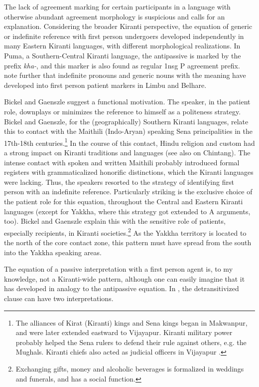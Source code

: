 The lack of agreement marking for certain participants in a language with otherwise abundant agreement morphology is suspicious and calls for an explanation. Considering the broader Kiranti perspective, the equation of generic or indefinite reference with first person undergoers developed independently in many Eastern Kiranti languages, with different morphological realizations. In Puma, a Southern-Central Kiranti language, the antipassive is marked by the prefix \emph{kha-}, and this marker is also found as regular 1nsg P agreement prefix.  \citet[6]{Bickeletal2005Generics} note further that indefinite pronouns and generic nouns with the meaning  have developed into first person patient markers in Limbu and Belhare. 

Bickel and Gaenszle suggest a functional motivation. The speaker, in the patient role, downplays or minimizes the reference to himself as a politeness strategy.  Bickel and Gaenszle, for the (geographically) Southern Kiranti languages, relate this to contact with the Maithili (Indo-Aryan) speaking Sena principalities in the 17th-18th centuries.\footnote{The alliances of Kirat (Kiranti) kings and Sena kings began in Makwanpur, and were later extended eastward to Vijayapur. Kiranti military power probably helped the Sena rulers to defend their rule against others, e.g. the Mughals. Kiranti chiefs also acted as judicial officers in Vijayapur \citep[76]{Pradhan1991The-Gorkha}.} In the course of this contact, Hindu religion and custom had a strong impact on Kiranti traditions and languages (see also \citet{Gaenszleetal2005Worshipping} on Chintang). The intense contact with  spoken and written Maithili probably introduced formal registers with grammaticalized honorific distinctions, which the Kiranti languages were lacking. Thus, the speakers resorted to the strategy of identifying first person with an indefinite reference. Particularly striking is  the exclusive choice of the patient role for this equation, throughout the Central and Eastern Kiranti languages (except for Yakkha, where this strategy got extended to A arguments, too). Bickel and Gaenszle explain this with the sensitive role of patients, especially recipients, in Kiranti societies.\footnote{Exchanging gifts, money and alcoholic beverages is formalized in weddings and funerals, and has a social function.} As the Yakkha territory is located to the north of the core contact zone, this pattern must have spread from the south into the Yakkha speaking areas.


The equation of a passive interpretation with a first person agent is, to my knowledge, not a Kiranti-wide pattern, although one can easily imagine that it has developed in analogy to the antipassive equation. In \Next, the detransitivized clause  can have two interpretations. 

